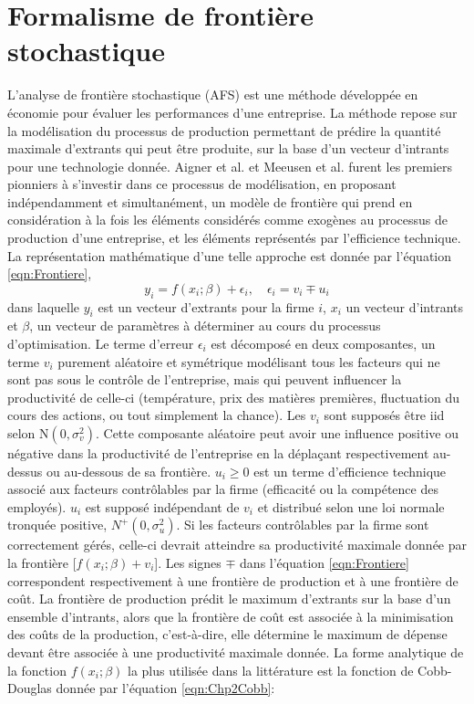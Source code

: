 \section{Formalisme de frontière stochastique}
L’analyse de frontière stochastique (AFS)  est une méthode développée en économie pour évaluer les performances d’une entreprise. La méthode repose sur la modélisation du processus de production permettant de prédire la quantité maximale d’extrants qui peut être produite, sur la base d’un vecteur d’intrants pour une technologie donnée. Aigner et al.\cite {aigner@2004} et Meeusen et al.\cite {meeusen@2004} furent les premiers pionniers à s’investir dans ce processus de modélisation, en proposant indépendamment et simultanément, un modèle de frontière qui prend en considération à la fois les éléments considérés comme exogènes au processus de production d’une entreprise, et les éléments représentés par l’efficience technique. La représentation mathématique d’une telle approche est donnée par l’équation \eqref{eqn:Frontiere},
%
\begin{equation}\label{eqn:Frontiere}
	y_{i} = f(x_{i}; \beta) + \epsilon_{i},  \quad \epsilon_{i} = v_{i} \mp u_{i}
\end{equation}
%
dans laquelle $y_{i} $ est un vecteur d’extrants pour la firme $ i $, $x_ {i} $ un vecteur d’intrants et $\beta $, un vecteur de paramètres à déterminer au cours du processus d’optimisation. Le terme d’erreur $\epsilon_ {i} $ est décomposé en deux composantes, un terme $v_{i}$ purement aléatoire et symétrique modélisant tous les facteurs qui ne sont pas sous le contrôle de l’entreprise, mais qui peuvent influencer la productivité de celle-ci (température, prix des matières premières, fluctuation du cours des actions, ou tout simplement la chance). Les $v_{i} $ sont supposés être iid selon N$(0, \sigma^{2}_{v})$. Cette composante aléatoire peut avoir une influence positive ou négative dans la productivité de l’entreprise en la déplaçant respectivement au-dessus ou au-dessous de sa frontière. $u_{i}\geq 0$ est un terme d’efficience technique associé aux facteurs contrôlables par la firme (efficacité ou la compétence des employés). $u_{i}$ est supposé indépendant de $v_{i}$ et distribué selon une loi normale tronquée positive, $N^{+}(0, \sigma^{2}_{u})$. Si les facteurs contrôlables par la firme sont correctement gérés, celle-ci devrait atteindre sa productivité maximale donnée par la frontière [$f(x_{i}; \beta) + v_{i}$]. Les signes $\mp$ dans l’équation \eqref{eqn:Frontiere} correspondent respectivement à une frontière de production et à une frontière de coût. La frontière de production prédit le maximum d’extrants sur la base d’un ensemble d’intrants, alors que la frontière de coût est associée à la minimisation des coûts de la production, c’est-à-dire, elle détermine le maximum de dépense devant être associée à une productivité maximale donnée. La forme analytique de la fonction $f(x_{i}; \beta)$ la plus utilisée dans la littérature est la fonction de Cobb-Douglas \cite{cobb@2004} donnée par l’équation \eqref{eqn:Chp2Cobb}:
